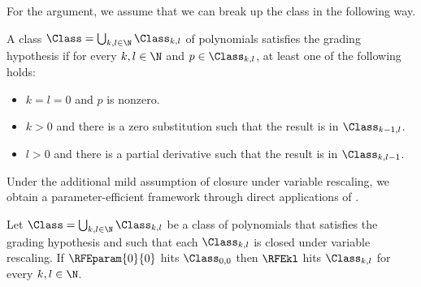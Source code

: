 For the argument, we assume that we can break up the class in the following way.
\begin{definition}
A class $\Class = \bigcup_{k,l \in \N} \Class_{k,l}$ of polynomials satisfies the grading hypothesis if for every \(k,l \in \N\) and \(p\in \Class_{k,l}\),
at least one of the following holds:
\begin{itemize}
  \item \(k=l=0\) and \(p\) is nonzero.
  \item
    \(k > 0\) and there is a zero substitution such that the result is in
    \(\Class_{k-1,l}\).
  \item
    \(l > 0\) and there is a partial derivative such that the result is in
    \(\Class_{k,l-1}\).
\end{itemize}
\end{definition}
Under the additional mild assumption of closure under variable rescaling, we obtain a parameter-efficient framework through
direct applications of .
\begin{proposition}\label{prop.zsub-deriv-power}
Let $\Class = \bigcup_{k,l \in \N} \Class_{k,l}$ be a class of polynomials that satisfies the grading hypothesis and such that each $\Class_{k,l}$ is closed under variable rescaling. If $\RFEparam{0}{0}$ hits $\Class_{0,0}$ then 
\(\RFEkl\) hits \(\Class_{k,l}\) for every \(k,l \in \N\).
\end{proposition}

